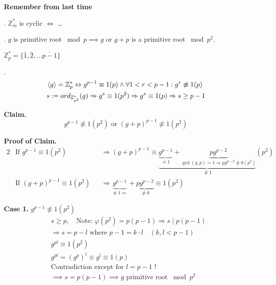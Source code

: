 

\textbf{Remember from last time}

\Theorem. $\mathbb{Z}_m^{*}$ is cyclic $\Leftrightarrow$ \dots

\Lemma. $g$ is primitive root $\bmod p \implies g$ or $g+p$ is a primitive root $\bmod{p^2}$.

\begin{leftbar}
  $\mathbb{Z}_p^{*} = \{\bar{1}, \bar{2}, \ldots \overline{p-1}\}$
\end{leftbar}
\Proof.
\begin{align*}
  &\left\langle g \right\rangle = \mathbb{Z}_p^{*} \Leftrightarrow g^{p-1} \equiv 1 (p) \land \forall 1 < r < p-1 : g^r \not\equiv 1(p) \\
  &s : = ord_{\mathbb{Z}_{p^2}^{*}} (g) \Rightarrow g^s \equiv 1 (p^2) \Rightarrow g^s \equiv 1 (p) \Rightarrow s \geq p-1
\end{align*}

\textbf{Claim.}
\[
  g^{p-1} \not\equiv 1 (p^2) \text{ or } (g+p)^{p-1} \not\equiv 1(p^2)
\]

\textbf{Proof of Claim.}
\begin{alignat*}{2}
  &\text{If } g^{p-1} \equiv 1(p^2)
  &&\Rightarrow (g+p)^{p-1} \equiv \underbrace{\underbrace{g^{p-1}}_{\equiv 1} + \underbrace{pg^{p-2}}_{\gcd(g,p) = 1 \Rightarrow pg^{p-2}\not\equiv 0 (p^2)}}_{\not\equiv 1} (p^2)\\
  &\text{If } (g+p)^{p-1} \equiv 1(p^2)
  &&\Rightarrow \underbrace{g^{p-1}}_{\not\equiv 1\Leftarrow} + \underbrace{pg^{p-2}}_{\not\equiv 0} \equiv 1 (p^2)
\end{alignat*}

\textbf{Case 1.} $g^{p-1} \not\equiv 1 (p^2)$
\begin{align*}
  &s \geq p, \quad\text{Note: } \varphi(p^2) = p(p-1) \Rightarrow s \mid p(p-1) \\
  &\Rightarrow s = p-l \text{ where } p-1 = k\cdot l \quad (k,l < p-1) \\
  &g^{pl} \equiv 1 (p^2) \\
  &g^{pl} = (g^p)^l \equiv g^l \equiv 1 (p) \\
  &\text{Contradiction except for } l = p-1 \text{ !}\\
  &\implies s = p(p-1) \implies g \text{ primitive root } \bmod p^2
\end{align*}

